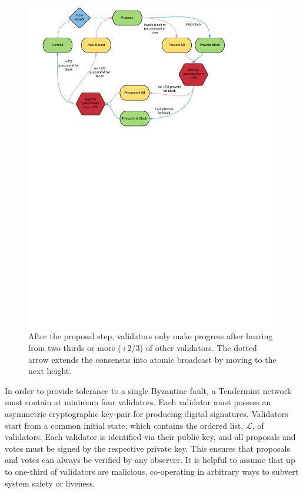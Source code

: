 \begin{figure}[]
	\includegraphics[width=\linewidth,height=\textheight,keepaspectratio]{figures/diagrams/consensus_logic.pdf}
    	\centering
	\caption[Overview of Tendermint consensus logic]{
After the proposal step, validators only make progress after hearing from two-thirds or more (+2/3) of other validators. The dotted arrow extends the consensus into atomic broadcast by moving to the next height.}
	\label{fig:consensus_logic}
\end{figure}

In order to provide tolerance to a single Byzantine fault, 
a Tendermint network must contain at minimum four validators.
Each validator must possess an asymmetric cryptographic key-pair for producing digital signatures.
Validators start from a common initial state, 
which contains the ordered list, $\mathcal{L}$, of validators.
Each validator is identified via their public key, and 
all proposals and votes must be signed by the respective private key.
This ensures that proposals and votes can always be verified by any observer.
It is helpful to assume that up to one-third of validators are malicious, 
co-operating in arbitrary ways to subvert system safety or liveness.

